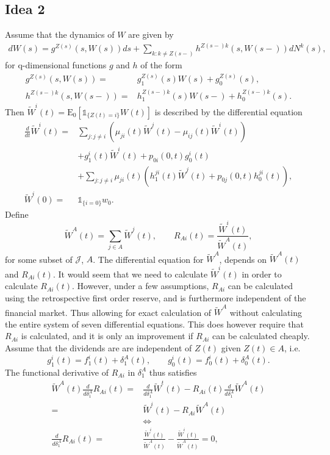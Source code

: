 \documentclass[12pt]{article}
\newcommand{\E}{\text{E}}
\newcommand{\indic}[1]{\mathds{1}_{ \{ #1 \} }}
\theoremstyle{my_thm}
\theoremstyle{my_def}
\theoremstyle{my_thm2}
\begin{document}
\subsection*{Idea 2}
Assume that the dynamics of $W$ are given by
\begin{align*}
dW(s)=  g^{Z(s)}(s,W(s))ds+
 \sum_{k:k \neq Z(s-)} h^{Z(s-)k}(s,W(s-)) dN^k(s),
\end{align*}
for q-dimensional functions $g$ and $h$ of the form
\begin{align*}
g^{Z(s)}(s,W(s))=&g^{Z(s)}_1(s) W(s)+g_0^{Z(s)}(s),
\\
h^{Z(s-)k}(s,W(s-))=&h_1^{Z(s-)k}(s) W(s-)+h_0^{Z(s-)k}(s).
\end{align*}
Then $\tilde{W}^i(t)=\E_0[\indic{Z(t)=i}W(t)]$ is described by the differential equation
\begin{align}
\frac{d}{dt}\tilde{W}^i(t)=&
\sum_{j:j \neq i} \left( \mu_{ji}(t) \tilde{W}^j(t)-\mu_{ij}(t)\tilde{W}^i(t) \right)
 \label{eq:AAH} \\
&+
 g_1^i(t)\tilde{W}^i(t)+p_{0i}(0,t)g_0^i(t)
 \label{eq:AAI}\\
&+
\sum_{j:j\neq i} \mu_{ji}(t) \left(  h_1^{ji}(t) \tilde{W}^j(t) + p_{0j}(0,t)h_0^{ji}(t)\right) ,\label{eq:AAF}
\\
\tilde{W}^i(0)=&\indic{i=0}w_0 .\label{eq:AAG}
\end{align}
Define
$$
\tilde{W}^A(t)=\sum_{j \in A} \tilde{W}^j(t), \qquad R_{Ai}(t)=\frac{\tilde{W}^i(t)}{\tilde{W}^A(t)},
$$
for some subset of $\mathcal{J}$, $A$. The differential equation for $\tilde{W}^A$, depends on $\tilde{W}^A(t)$ and $R_{Ai}(t)$. It would seem that we need to calculate $\tilde{W}^i(t)$ in order to calculate $R_{Ai}(t)$. However, under a few assumptions, $R_{Ai}$ can be calculated using the retrospective first order reserve, and is furthermore independent of the financial market. Thus allowing for exact calculation of $\tilde{W}^A$ without calculating the entire system of seven differential equations. This does however require that $R_{Ai}$ is calculated, and it is only an improvement if $R_{Ai}$ can be calculated cheaply.
\\[12pt]
Assume that the dividends are are independent of $Z(t)$ given $Z(t)\in A$, i.e.
$$
g_1^i(t)=f_1^i(t)+\delta_1^A(t), \qquad g_0^i(t)=f_0^i(t)+\delta_0^A(t).
$$
The functional derivative of $R_{Ai}$ in $\delta_1^A$ thus satisfies
\begin{align*}
\tilde{W}^A(t) \frac{d}{d \delta_1^A}R_{Ai}(t)=&\frac{d}{d \delta_1^A}\tilde{W}^t(t)-R_{Ai}(t) \frac{d}{d \delta_1^A}\tilde{W}^A(t)
\\
=&\tilde{W}^i(t)-R_{Ai}\tilde{W}^A(t)
\\
&\Leftrightarrow
\\
\frac{d}{d \delta_1^A}R_{Ai}(t)=&\frac{\tilde{W}^i(t)}{\tilde{W}^A(t)}-\frac{\tilde{W}^i(t)}{\tilde{W}^A(t)}=0,
\end{align*}
\end{document}
